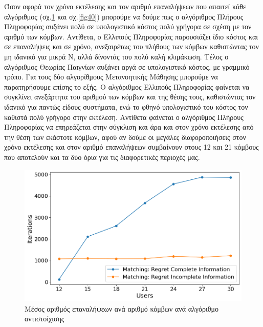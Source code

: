 Όσον αφορά τον χρόνο εκτέλεσης και τον αριθμό επαναλήψεων που απαιτεί κάθε αλγόριθμος (σχ.\ref{fig39} και σχ.\ref{fig40}) μπορούμε να δούμε πως ο αλγόριθμος Πλήρους Πληροφορίας αυξάνει πολύ σε υπολογιστικό κόστος πολύ γρήγορα σε σχέση με τον αριθμό των κόμβων. Αντίθετα, ο Ελλιπούς Πληροφορίας παρουσιάζει ίδιο κόστος και σε επαναλήψεις και σε χρόνο, ανεξαιρέτως του πλήθους των κόμβων καθιστώντας τον μη ιδανικό για μικρά Ν, αλλά δίνοντάς του πολύ καλή κλιμάκωση.  Τέλος ο αλγόριθμος Θεωρίας Παιγνίων αυξάνει αργά σε υπολογιστικό κόστος, με γραμμικό τρόπο. Για τους δύο αλγορίθμους Μετανοητικής Μάθησης μπορούμε να παρατηρήσουμε επίσης το εξής. Ο αλγόριθμος Ελλιπούς Πληροφορίας φαίνεται να συγκλίνει ανεξάρτητα του αριθμού των κόμβων και της θέσης τους, καθιστώντας τον ιδανικό για παντώς είδους συστήματα, ενώ το φθηνό υπολογιστικό του κόστος τον καθιστά πολύ γρήγορο στην εκτέλεση. Αντίθετα φαίνεται ο αλγόριθμος Πλήρους Πληροφορίας να επηρεάζεται στην σύγκλιση και άρα και στον χρόνο εκτέλεσης από την θέση των εκάστοτε κόμβων, αφού αν δούμε οι μεγάλες διαφοροποιήσεις στον χρόνο εκτέλεσης και στον αριθμό επαναλήψεων συμβαίνουν στους 12 και 21 κόμβους που αποτελούν και τα δύο όρια για τις διαφορετικές περιοχές μας.

\begin{figure}[H]
    \centering
    \includegraphics[width=\textwidth]{figures/chapter4/Iterations_vs_Users.png}
    \caption{Μέσος αριθμός επαναλήψεων ανά αριθμό κόμβων ανά αλγόριθμο αντιστοίχισης}
    \label{fig39}
\end{figure}

\newpage

